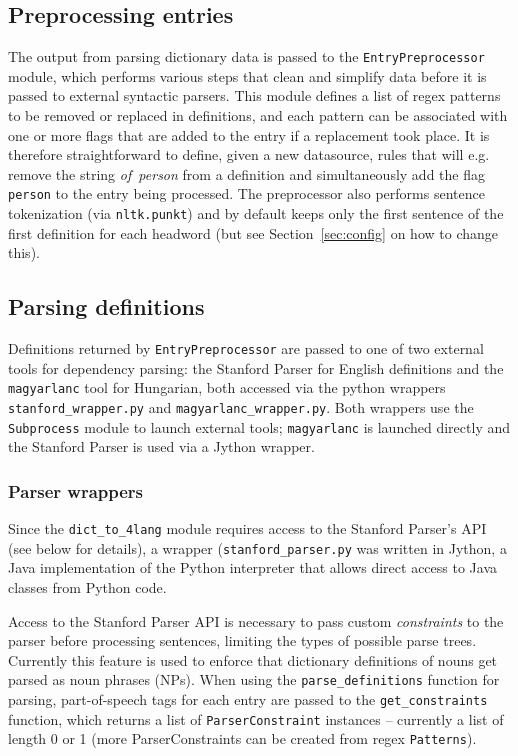 \documentclass{article}
\newcommand{\difl}{\texttt{dict\_to\_4lang}\xspace}
\begin{document}
\subsection{Preprocessing entries}
The output from parsing dictionary data is passed to the
\texttt{EntryPreprocessor} module, which performs various steps that clean and
simplify data before it is passed to external syntactic parsers. This module
defines a list of regex patterns to be removed or replaced in definitions, and
each pattern can be associated with one or more flags that are added to the
entry if a replacement took place. It is therefore straightforward to define,
given a new datasource, rules that will e.g. remove the string
\textit{of~person} from a definition and simultaneously add the flag
\texttt{person} to the entry being processed. The preprocessor also performs
sentence tokenization (via \texttt{nltk.punkt}) and by default keeps only the
first sentence of the first definition for each headword (but see
Section~\ref{sec:config} on how to change this).

\subsection{Parsing definitions}
Definitions returned by \texttt{EntryPreprocessor} are passed to one of two
external tools for dependency parsing: the Stanford Parser for English
definitions and the \texttt{magyarlanc} tool for Hungarian, both accessed via
the python wrappers \texttt{stanford\_wrapper.py} and
\texttt{magyarlanc\_wrapper.py}. Both wrappers use the \texttt{Subprocess}
module to launch external tools; \texttt{magyarlanc} is launched directly and
the Stanford Parser is used via a Jython wrapper.

\subsubsection{Parser wrappers}
\label{sec:jython}
Since the \difl module requires access to the Stanford Parser's API (see below
for details), a wrapper (\texttt{stanford\_parser.py} was written in
Jython, a Java implementation of the Python interpreter that allows
direct access to Java classes from
Python code.

Access to the Stanford Parser API is necessary to pass custom
\textit{constraints} to the parser before processing sentences, limiting the
types of possible parse trees. Currently this feature is used to enforce that
dictionary definitions of nouns get parsed as noun phrases (NPs). When using
the \texttt{parse\_definitions} function for parsing, part-of-speech tags for
each entry are passed to the \texttt{get\_constraints} function, which returns
a list of \texttt{ParserConstraint} instances -- currently a list of length 0
or 1 (more ParserConstraints can be created from regex \texttt{Patterns}).
\end{document}
